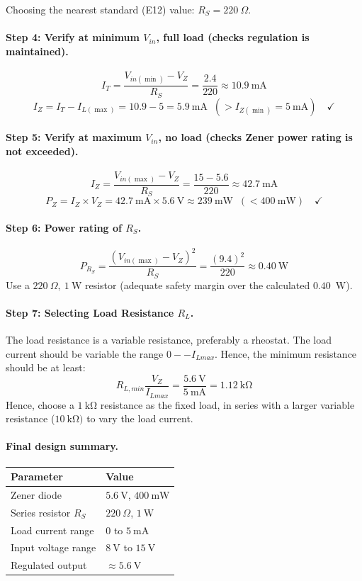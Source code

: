 Choosing the nearest standard (E12) value: $\boxed{R_S = 220\ \Omega}$.

\paragraph{Step 4: Verify at minimum $V_{in}$, full load (checks regulation is maintained).}
\[
I_{T} = \frac{V_{in(\min)} - V_Z}{R_S} = \frac{2.4}{220} \approx 10.9\ \text{mA}
\]
\[
I_Z = I_T - I_{L(\max)} = 10.9 - 5 = 5.9\ \text{mA} \;\; (> I_{Z(\min)} = 5\ \text{mA}) \quad \checkmark
\]

\paragraph{Step 5: Verify at maximum $V_{in}$, no load (checks Zener power rating is not exceeded).}
\[
I_{Z} = \frac{V_{in(\max)} - V_Z}{R_S} = \frac{15 - 5.6}{220} \approx 42.7\ \text{mA}
\]
\[
P_Z = I_Z \times V_Z = 42.7\ \text{mA} \times 5.6\ \text{V} \approx 239\ \text{mW} \;\; (< 400\ \text{mW}) \quad \checkmark
\]

\paragraph{Step 6: Power rating of $R_S$.}
\[
P_{R_S} = \frac{(V_{in(\max)} - V_Z)^2}{R_S} = \frac{(9.4)^2}{220} \approx 0.40\ \text{W}
\]
Use a $220\ \Omega,\ 1\ \text{W}$ resistor (adequate safety margin over the calculated $0.40$~W).
\paragraph{Step 7: Selecting Load Resistance $R_L$.}
The load resistance is a variable resistance, preferably a rheostat. The load current should be variable the range $0--I_{Lmax}$. Hence, the minimum resistance should be at least:
\[
R_{L,min}\frac{V_Z}{I_{Lmax}} = \frac{\SI{5.6}{\volt}}{\SI{5}{\milli\ampere}} = \SI{1.12}{\kilo\ohm}
\]
Hence, choose a $\SI{1}{\kilo\ohm}$ resistance as the fixed load, in series with a larger variable resistance ($\SI{10}{\kilo\ohm})$ to vary the load current. 
\paragraph{Final design summary.}
\begin{center}
	\begin{tabular}{@{}ll@{}}
		\toprule
		Parameter & Value \\
		\midrule
		Zener diode & $5.6\ \text{V}$, $400\ \text{mW}$ \\
		Series resistor $R_S$ & $220\ \Omega$, $1\ \text{W}$ \\
		Load current range & $0$ to $5\ \text{mA}$ \\
		Input voltage range & $8\ \text{V}$ to $15\ \text{V}$ \\
		Regulated output & $\approx 5.6\ \text{V}$ \\
		\bottomrule
	\end{tabular}
\end{center}

